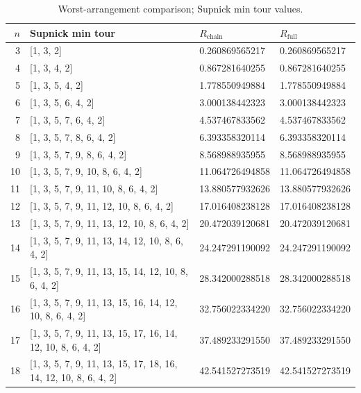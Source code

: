 \begin{table}
\centering
\begin{tabular}{rlll}
\toprule
$n$ & Supnick min tour & $R_{\mathrm{chain}}$ & $R_{\mathrm{full}}$ \\
\midrule
3 & [1, 3, 2] & 0.260869565217 & 0.260869565217 \\
4 & [1, 3, 4, 2] & 0.867281640255 & 0.867281640255 \\
5 & [1, 3, 5, 4, 2] & 1.778550949884 & 1.778550949884 \\
6 & [1, 3, 5, 6, 4, 2] & 3.000138442323 & 3.000138442323 \\
7 & [1, 3, 5, 7, 6, 4, 2] & 4.537467833562 & 4.537467833562 \\
8 & [1, 3, 5, 7, 8, 6, 4, 2] & 6.393358320114 & 6.393358320114 \\
9 & [1, 3, 5, 7, 9, 8, 6, 4, 2] & 8.568988935955 & 8.568988935955 \\
10 & [1, 3, 5, 7, 9, 10, 8, 6, 4, 2] & 11.064726494858 & 11.064726494858 \\
11 & [1, 3, 5, 7, 9, 11, 10, 8, 6, 4, 2] & 13.880577932626 & 13.880577932626 \\
12 & [1, 3, 5, 7, 9, 11, 12, 10, 8, 6, 4, 2] & 17.016408238128 & 17.016408238128 \\
13 & [1, 3, 5, 7, 9, 11, 13, 12, 10, 8, 6, 4, 2] & 20.472039120681 & 20.472039120681 \\
14 & [1, 3, 5, 7, 9, 11, 13, 14, 12, 10, 8, 6, 4, 2] & 24.247291190092 & 24.247291190092 \\
15 & [1, 3, 5, 7, 9, 11, 13, 15, 14, 12, 10, 8, 6, 4, 2] & 28.342000288518 & 28.342000288518 \\
16 & [1, 3, 5, 7, 9, 11, 13, 15, 16, 14, 12, 10, 8, 6, 4, 2] & 32.756022334220 & 32.756022334220 \\
17 & [1, 3, 5, 7, 9, 11, 13, 15, 17, 16, 14, 12, 10, 8, 6, 4, 2] & 37.489233291550 & 37.489233291550 \\
18 & [1, 3, 5, 7, 9, 11, 13, 15, 17, 18, 16, 14, 12, 10, 8, 6, 4, 2] & 42.541527273519 & 42.541527273519 \\
\bottomrule
\end{tabular}
\caption{Worst-arrangement comparison; Supnick min tour values.}
\end{table}
